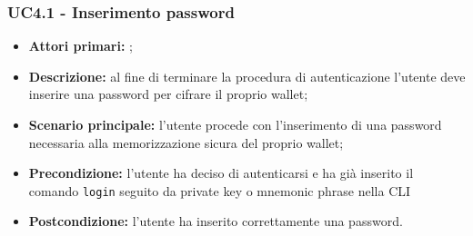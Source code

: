 \subsubsection{UC4.1 - Inserimento password}
\begin{itemize}
	\item \textbf{Attori primari:} \una{};
	\item \textbf{Descrizione:} al fine di terminare la procedura di autenticazione l’utente deve inserire una password per cifrare il proprio wallet;
	\item \textbf{Scenario principale:} l’utente procede con l’inserimento di 
	una password necessaria alla memorizzazione sicura del proprio wallet;  
	\item \textbf{Precondizione:} l’utente ha deciso di autenticarsi e ha già inserito
	il comando \texttt{login} seguito da private key o mnemonic phrase nella CLI  
	\item \textbf{Postcondizione:} l’utente ha inserito correttamente una password. 
\end{itemize}
